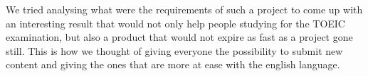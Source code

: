 \documentclass[12pt,a4paper]{report}
\begin{document}
We tried analysing what were the requirements of such a project to come up with
an interesting result that would not only help people studying for the TOEIC
examination, but also a product that would not expire as fast as a project gone
still. This is how we thought of giving everyone the possibility to submit new
content and giving the ones that are more at ease with the english language.


\end{document}
